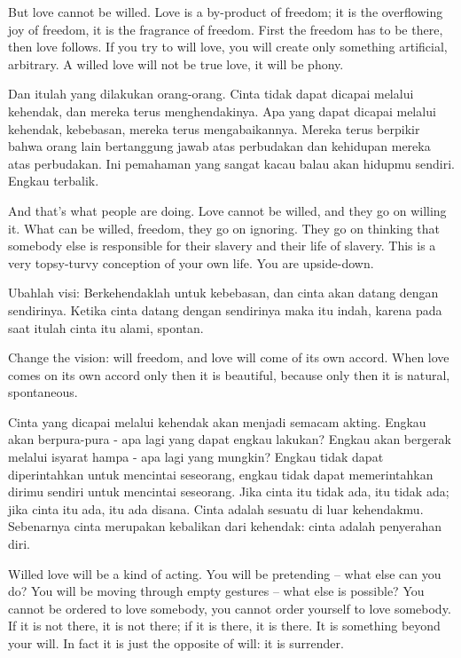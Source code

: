 \english
But love cannot be willed. Love is a by-product of freedom; it is the overflowing joy of freedom, it is the fragrance of freedom. First the freedom has to be there, then love follows. If you try to will love, you will create only something artificial, arbitrary. A willed love will not be true love, it will be phony.

\bahasa
Dan itulah yang dilakukan orang-orang. Cinta tidak dapat dicapai melalui kehendak, dan mereka terus menghendakinya. Apa yang dapat dicapai melalui kehendak, kebebasan, mereka terus mengabaikannya. Mereka terus berpikir bahwa orang lain bertanggung jawab atas perbudakan dan kehidupan mereka atas perbudakan. Ini pemahaman yang sangat kacau balau akan hidupmu sendiri. Engkau terbalik.

\english
And that's what people are doing. Love cannot be willed, and they go on willing it. What can be willed, freedom, they go on ignoring. They go on thinking that somebody else is responsible for their slavery and their life of slavery. This is a very topsy-turvy conception of your own life. You are upside-down.

\bahasa
Ubahlah visi: Berkehendaklah untuk kebebasan, dan cinta akan datang dengan sendirinya. Ketika cinta datang dengan sendirinya maka itu indah, karena pada saat itulah cinta itu alami, spontan.

\english
Change the vision: will freedom, and love will come of its own accord. When love comes on its own accord only then it is beautiful, because only then it is natural, spontaneous.

\bahasa
Cinta yang dicapai melalui kehendak akan menjadi semacam akting. Engkau akan berpura-pura - apa lagi yang dapat engkau lakukan? Engkau akan bergerak melalui isyarat hampa - apa lagi yang mungkin? Engkau tidak dapat diperintahkan untuk mencintai seseorang, engkau tidak dapat memerintahkan dirimu sendiri untuk mencintai seseorang. Jika cinta itu tidak ada, itu tidak ada; jika cinta itu ada, itu ada disana. Cinta adalah sesuatu di luar kehendakmu. Sebenarnya cinta merupakan kebalikan dari kehendak: cinta adalah penyerahan diri.

\english
Willed love will be a kind of acting. You will be pretending -- what else can you do? You will be moving through empty gestures -- what else is possible? You cannot be ordered to love somebody, you cannot order yourself to love somebody. If it is not there, it is not there; if it is there, it is there. It is something beyond your will. In fact it is just the opposite of will: it is surrender.

